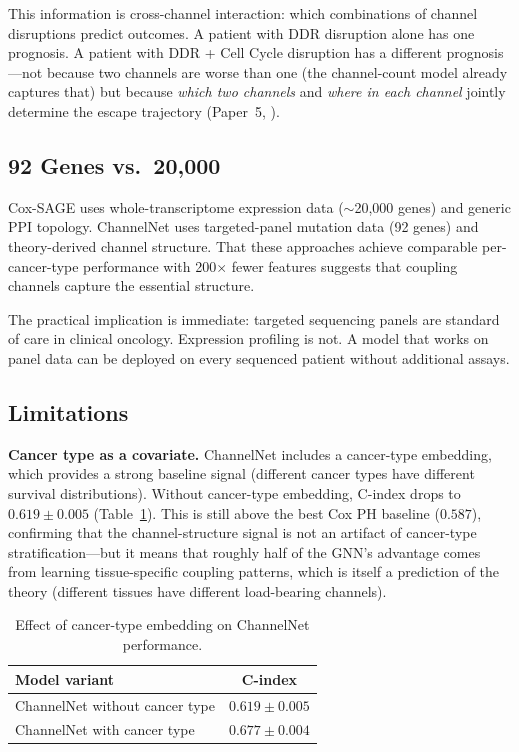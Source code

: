 \documentclass[11pt]{article}
\begin{document}
This information is cross-channel interaction: which combinations
of channel disruptions predict outcomes. A patient with DDR
disruption alone has one prognosis. A patient with DDR + Cell
Cycle disruption has a different prognosis---not because two
channels are worse than one (the channel-count model already
captures that) but because \emph{which two channels} and
\emph{where in each channel} jointly determine the escape
trajectory (Paper~5, \cite{McCarthy2026e}).

\subsection{92 Genes vs.\ 20{,}000}

Cox-SAGE uses whole-transcriptome expression data
($\sim$20{,}000 genes) and generic PPI topology. ChannelNet
uses targeted-panel mutation data (92 genes) and theory-derived
channel structure. That these approaches achieve comparable
per-cancer-type performance with 200$\times$ fewer features
suggests that coupling channels capture the essential structure.

The practical implication is immediate: targeted sequencing
panels are standard of care in clinical oncology. Expression
profiling is not. A model that works on panel data can be
deployed on every sequenced patient without additional assays.

\subsection{Limitations}

\textbf{Cancer type as a covariate.} ChannelNet includes a
cancer-type embedding, which provides a strong baseline signal
(different cancer types have different survival distributions).
Without cancer-type embedding, C-index drops to
$0.619 \pm 0.005$ (Table~\ref{tab:ablation-cancer-type}).
This is still above the best Cox PH baseline ($0.587$),
confirming that the channel-structure signal is not an artifact
of cancer-type stratification---but it means that roughly half
of the GNN's advantage comes from learning tissue-specific
coupling patterns, which is itself a prediction of the theory
(different tissues have different load-bearing channels).

\begin{table}[ht]
\centering
\caption{Effect of cancer-type embedding on ChannelNet performance.}
\label{tab:ablation-cancer-type}
\begin{tabular}{@{}lc@{}}
\toprule
Model variant & C-index \\
\midrule
ChannelNet without cancer type & $0.619 \pm 0.005$ \\
ChannelNet with cancer type & $0.677 \pm 0.004$ \\
\bottomrule
\end{tabular}
\end{table}
\end{document}
